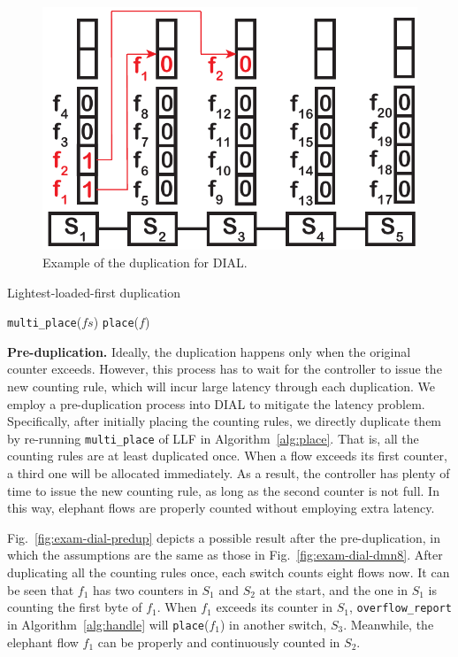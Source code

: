 \begin{figure}
    \centering
    \includegraphics[width=0.6\linewidth]{pic/exam-dial-place.pdf}
    \caption{Example of the duplication for DIAL.}
    \label{fig:exam-dial-place}
\end{figure}

\begin{algorithm}[t]\small
\caption{Lightest-loaded-first duplication}
\label{alg:place}
\BlankLine
\texttt{multi\_place}($fs$)
\BlankLine
\texttt{place}($f$)
\end{algorithm}

\textbf{Pre-duplication.}
Ideally, the duplication happens only when the original counter exceeds.
However, this process has to wait for the controller to issue the new counting rule, which will incur large latency through each duplication.
We employ a pre-duplication process into DIAL to mitigate the latency problem.
Specifically, after initially placing the counting rules, we directly duplicate them by re-running \texttt{multi\_place} of LLF in Algorithm~\ref{alg:place}.
That is, all the counting rules are at least duplicated once.
When a flow exceeds its first counter, a third one will be allocated immediately.
As a result, the controller has plenty of time to issue the new counting rule, as long as the second counter is not full.
In this way, elephant flows are properly counted without employing extra latency.

Fig.~\ref{fig:exam-dial-predup} depicts a possible result after the pre-duplication, in which the assumptions are the same as those in Fig.~\ref{fig:exam-dial-dmn8}.
After duplicating all the counting rules once, each switch counts eight flows now.
It can be seen that $f_1$ has two counters in $S_1$ and $S_2$ at the start, and the one in $S_1$ is counting the first byte of $f_1$.
When $f_1$ exceeds its counter in $S_1$, \texttt{overflow\_report} in Algorithm~\ref{alg:handle} will \texttt{place}($f_1$) in another switch, $S_3$. Meanwhile, the elephant flow $f_1$ can be properly and continuously counted in $S_2$.

